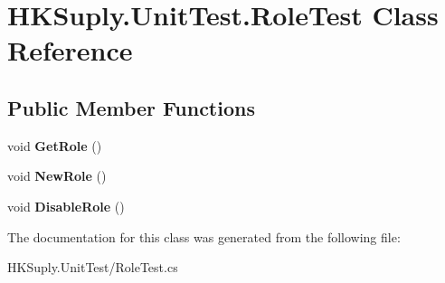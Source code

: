 \hypertarget{class_h_k_suply_1_1_unit_test_1_1_role_test}{}\section{H\+K\+Suply.\+Unit\+Test.\+Role\+Test Class Reference}
\label{class_h_k_suply_1_1_unit_test_1_1_role_test}
\subsection*{Public Member Functions}
\begin{DoxyCompactItemize}
\item 
\mbox{\label{class_h_k_suply_1_1_unit_test_1_1_role_test_a8a280b4286b4071e13440d7c7f179e13}} 
void {\bfseries Get\+Role} ()
\item 
\mbox{\label{class_h_k_suply_1_1_unit_test_1_1_role_test_ad7e762c47c24c111dac35a0539f1325a}} 
void {\bfseries New\+Role} ()
\item 
\mbox{\label{class_h_k_suply_1_1_unit_test_1_1_role_test_ad1920b59b54f4b79a8aefb62060d6375}} 
void {\bfseries Disable\+Role} ()
\end{DoxyCompactItemize}


The documentation for this class was generated from the following file\+:\begin{DoxyCompactItemize}
\item 
H\+K\+Suply.\+Unit\+Test/Role\+Test.\+cs\end{DoxyCompactItemize}
